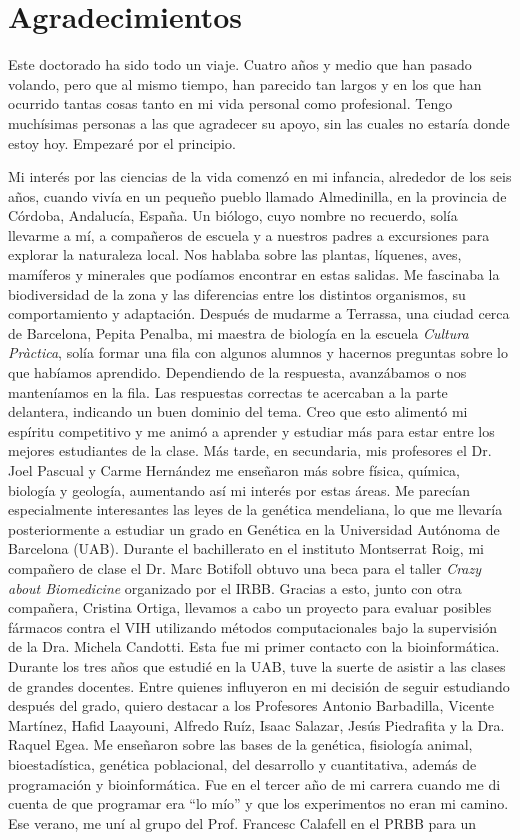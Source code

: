 \chapter*{Agradecimientos} %

Este doctorado ha sido todo un viaje. Cuatro años y medio que han pasado volando, pero que al mismo tiempo, han parecido tan largos y en los que han ocurrido tantas cosas tanto en mi vida personal como profesional. Tengo muchísimas personas a las que agradecer su apoyo, sin las cuales no estaría donde estoy hoy. Empezaré por el principio.

Mi interés por las ciencias de la vida comenzó en mi infancia, alrededor de los seis años, cuando vivía en un pequeño pueblo llamado Almedinilla, en la provincia de Córdoba, Andalucía, España. Un biólogo, cuyo nombre no recuerdo, solía llevarme a mí, a compañeros de escuela y a nuestros padres a excursiones para explorar la naturaleza local. Nos hablaba sobre las plantas, líquenes, aves, mamíferos y minerales que podíamos encontrar en estas salidas. Me fascinaba la biodiversidad de la zona y las diferencias entre los distintos organismos, su comportamiento y adaptación. Después de mudarme a Terrassa, una ciudad cerca de Barcelona, Pepita Penalba, mi maestra de biología en la escuela \textit{Cultura Pràctica}, solía formar una fila con algunos alumnos y hacernos preguntas sobre lo que habíamos aprendido. Dependiendo de la respuesta, avanzábamos o nos manteníamos en la fila. Las respuestas correctas te acercaban a la parte delantera, indicando un buen dominio del tema. Creo que esto alimentó mi espíritu competitivo y me animó a aprender y estudiar más para estar entre los mejores estudiantes de la clase. Más tarde, en secundaria, mis profesores el Dr. Joel Pascual y Carme Hernández me enseñaron más sobre física, química, biología y geología, aumentando así mi interés por estas áreas. Me parecían especialmente interesantes las leyes de la genética mendeliana, lo que me llevaría posteriormente a estudiar un grado en Genética en la Universidad Autónoma de Barcelona (UAB). Durante el bachillerato en el instituto Montserrat Roig, mi compañero de clase el Dr. Marc Botifoll obtuvo una beca para el taller \textit{Crazy about Biomedicine} organizado por el IRBB. Gracias a esto, junto con otra compañera, Cristina Ortiga, llevamos a cabo un proyecto para evaluar posibles fármacos contra el VIH utilizando métodos computacionales bajo la supervisión de la Dra. Michela Candotti. Esta fue mi primer contacto con la bioinformática. Durante los tres años que estudié en la UAB, tuve la suerte de asistir a las clases de grandes docentes. Entre quienes influyeron en mi decisión de seguir estudiando después del grado, quiero destacar a los Profesores Antonio Barbadilla, Vicente Martínez, Hafid Laayouni, Alfredo Ruíz, Isaac Salazar, Jesús Piedrafita y la Dra. Raquel Egea. Me enseñaron sobre las bases de la genética, fisiología animal, bioestadística, genética poblacional, del desarrollo y cuantitativa, además de programación y bioinformática. Fue en el tercer año de mi carrera cuando me di cuenta de que programar era ``lo mío'' y que los experimentos no eran mi camino. Ese verano, me uní al grupo del Prof. Francesc Calafell en el PRBB para un 